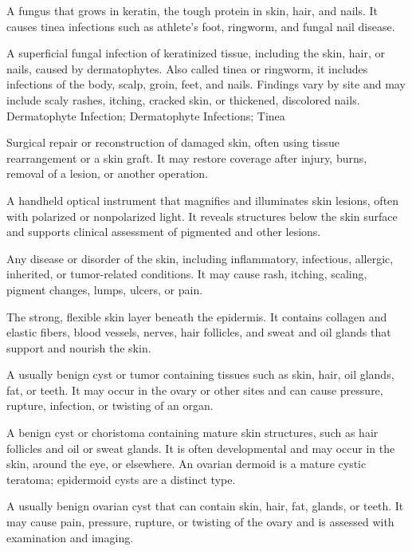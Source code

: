  A fungus that grows in keratin, the tough protein in skin, hair, and nails. It causes tinea infections such as athlete’s foot, ringworm, and fungal nail disease.

 A superficial fungal infection of keratinized tissue, including the skin, hair,
or nails, caused by dermatophytes. Also called tinea or ringworm, it includes infections
of the body, scalp, groin, feet, and nails. Findings vary by site and may include scaly
rashes, itching, cracked skin, or thickened, discolored nails.
\synonyms
Dermatophyte Infection; Dermatophyte Infections; Tinea

 Surgical repair or reconstruction of damaged skin, often using tissue rearrangement or a skin graft. It may restore coverage after injury, burns, removal of a lesion, or another operation.

 A handheld optical instrument that magnifies and illuminates skin lesions, often with polarized or nonpolarized light. It reveals structures below the skin surface and supports clinical assessment of pigmented and other lesions.

 Any disease or disorder of the skin, including inflammatory, infectious, allergic, inherited, or tumor-related conditions. It may cause rash, itching, scaling, pigment changes, lumps, ulcers, or pain.

 The strong, flexible skin layer beneath the epidermis. It contains collagen and elastic fibers, blood vessels, nerves, hair follicles, and sweat and oil glands that support and nourish the skin.

 A usually benign cyst or tumor containing tissues such as skin, hair, oil glands, fat, or teeth. It may occur in the ovary or other sites and can cause pressure, rupture, infection, or twisting of an organ.

 A benign cyst or choristoma containing mature skin structures, such as hair follicles
and oil or sweat glands. It is often developmental and may occur in the skin, around the eye, or elsewhere.
An ovarian dermoid is a mature cystic teratoma; epidermoid cysts are a distinct type.


 A usually benign ovarian cyst that can contain skin, hair, fat, glands, or teeth. It may cause pain, pressure, rupture, or twisting of the ovary and is assessed with examination and imaging.

